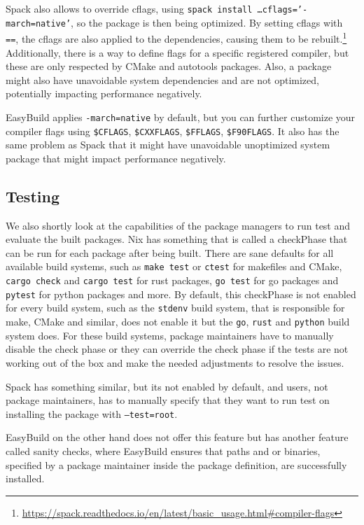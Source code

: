 \documentclass{eceasst}
\begin{document}
Spack also allows to override cflags, using \texttt{spack install \ldots cflags='-march=native'}, so the package is then being optimized.
By setting cflags with \texttt{==}, the cflags are also applied to the dependencies, causing them to be rebuilt.\footnote{\url{https://spack.readthedocs.io/en/latest/basic_usage.html\#compiler-flags}}
Additionally, there is a way to define flags for a specific registered compiler, but these are only respected by CMake and autotools packages.
Also, a package might also have unavoidable system dependencies and are not optimized, potentially impacting performance negatively.

EasyBuild applies \texttt{-march=native} by default, but you can further customize your compiler flags using \texttt{\$CFLAGS}, \texttt{\$CXXFLAGS}, \texttt{\$FFLAGS}, \texttt{\$F90FLAGS}.
It also has the same problem as Spack that it might have unavoidable unoptimized system package that might impact performance negatively.\\

\subsection{Testing}

We also shortly look at the capabilities of the package managers to run test and evaluate the built packages.
Nix has something that is called a checkPhase that can be run for each package after being built.
There are sane defaults for all available build systems, such as \texttt{make test} or \texttt{ctest} for makefiles and CMake, \texttt{cargo check} and \texttt{cargo test} for rust packages, \texttt{go test} for go packages and \texttt{pytest} for python packages and more.
By default, this checkPhase is not enabled for every build system, such as the \texttt{stdenv} build system, that is responsible for make, CMake and similar, does not enable it but the \texttt{go}, \texttt{rust} and \texttt{python} build system does.
For these build systems, package maintainers have to manually disable the check phase or they can override the check phase if the tests are not working out of the box and make the needed adjustments to resolve the issues.

Spack has something similar, but its not enabled by default, and users, not package maintainers, has to manually specify that they want to run test on installing the package with \texttt{--test=root}.

EasyBuild on the other hand does not offer this feature but has another feature called sanity checks, where EasyBuild ensures that paths and or binaries, specified by a package maintainer inside the package definition, are successfully installed.
\end{document}
